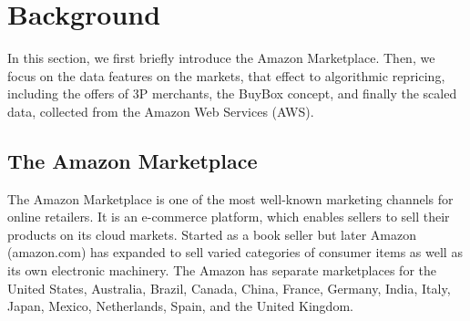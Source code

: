 \section{Background}
\label{sec:Background}
In this section, we first briefly introduce the Amazon Marketplace. Then, we focus on the data features on the markets, that effect to algorithmic repricing, including the offers of 3P merchants, the BuyBox concept, and finally the scaled data, collected from the Amazon Web Services (AWS).

\subsection{The Amazon Marketplace}
\label{sec:amzintro}
The Amazon Marketplace is one of the most well-known marketing channels for online retailers. 
It is an e-commerce platform, which enables  sellers to sell their products on its cloud markets. 
Started as a book seller but later Amazon (amazon.com) has expanded to sell varied categories of consumer 
items as well as its own electronic machinery. The Amazon has separate marketplaces for the United States, 
Australia, Brazil, Canada, China, France, Germany, India, Italy, Japan, Mexico, Netherlands, Spain, and the United Kingdom.

